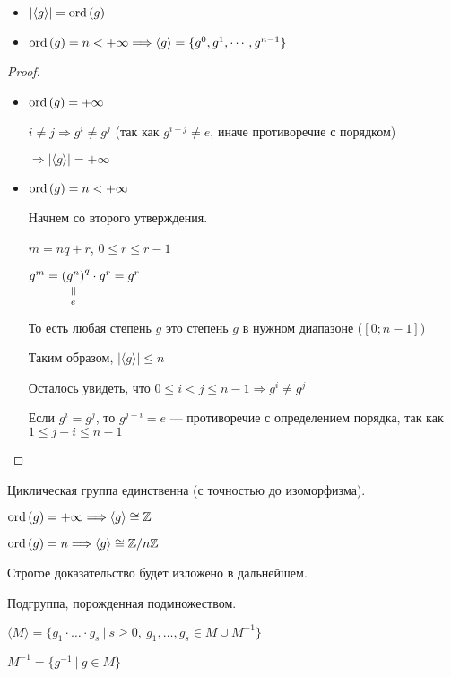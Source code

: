 \begin{theorem-non}

  \begin{itemize}
  \item $|\langle g \rangle| = \operatorname{ord}\left( g \right)$
  \item $\operatorname{ord}\left( g \right) = n < +\infty \Longrightarrow \langle g \rangle = \{ g^0, g^1, \cdots, g^{n-1} \}$
  \end{itemize}

\begin{proof}
  \begin{itemize}
    \item $\operatorname{ord}\left( g \right) = +\infty$

    $i \neq j \Longrightarrow g^i \neq g^j$ (так как $g^{i-j} \neq e$, иначе противоречие с порядком)

    $\Longrightarrow |\langle g \rangle| = +\infty$
    
    \item $\operatorname{ord}\left( g \right) = n < +\infty$
    
    Начнем со второго утверждения. 
    
    $m = nq + r$, $0 \leq r \leq r - 1$
    
    $g^m = \equalto{(g^n)}{e}^q \cdot g^r = g^r$

    То есть любая степень $g$ это степень $g$ в нужном диапазоне ($[0; n-1]$)

    Таким образом, $|\langle g \rangle| \leq n$

    Осталось увидеть, что $0 \leq i < j \leq n - 1 \Longrightarrow g^i\neq g^j $

    Если $g^i = g^j$, то $g^{j-i} = e$ --- противоречие с определением порядка, так как $1 \leq j - i \leq n - 1$
  \end{itemize}
\end{proof}
\end{theorem-non}

\notice Циклическая группа единственна (с точностью до изоморфизма).

$\operatorname{ord}\left( g \right) = +\infty \Longrightarrow \langle g \rangle \cong \mathbb{Z}$

$\operatorname{ord}\left( g \right) = n \Longrightarrow \langle g \rangle \cong \mathbb{Z}/n \mathbb{Z}$

Строгое доказательство будет изложено в дальнейшем.

\begin{conj}
  Подгруппа, порожденная подмножеством.

  $\langle M \rangle = \{ g_1 \cdot \ldots \cdot g_s\ |\ s \geq 0,\ g_1, \ldots, g_s \in M \cup M^{-1} \}$

  $M^{-1} = \{ g^{-1}\ |\ g\in M \}$
  
\end{conj}

